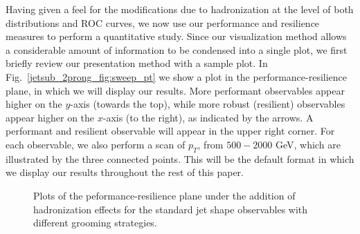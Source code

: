 \documentclass[11pt,letterpaper]{article}
\begin{document}
Having given a feel for the modifications due to hadronization at the level of both distributions and ROC curves, we now use our performance and resilience measures to perform a quantitative study.
%
Since our visualization method allows a considerable amount of information to be condensed into a single plot, we first briefly review our presentation method with a sample plot.
%
In Fig.~\ref{jetsub_2prong_fig:sweep_pt} we show a plot in the performance-resilience plane, in which we will display our results.
%
More performant observables appear higher on the $y$-axis (towards the top), while more robust (resilient) observables appear higher on the $x$-axis (to the right), as indicated by the arrows.
%
A performant and resilient observable will appear in the upper right corner.
%
For each observable, we also perform a scan of $p_T$, from $500-2000$ GeV, which are illustrated by the three connected points.
%
This will be the default format in which we display our results throughout the rest of this paper.


\begin{figure}
  \caption{Plots of the peformance-resilience plane under the addition of hadronization effects for the standard jet shape observables with different grooming strategies.}\label{jetsub_2prong_fig:grooming-hadronisation}
\end{figure}
\end{document}

